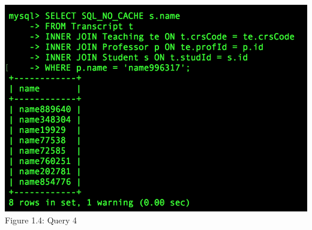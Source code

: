 \documentclass[11pt]{report}
\begin{document}
\begin{center}
			\includegraphics[scale=0.58]{b4.PNG}\\
			Figure 1.4: Query 4\\

\end{center}
\end{document}
